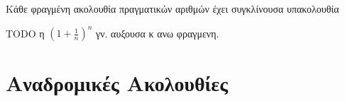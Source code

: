 \documentclass[main.tex]{subfiles}
\begin{document}
\begin{thm}
    Κάθε φραγμένη ακολουθία πραγματικών αριθμών έχει συγκλίνουσα 
    υπακολουθία
\end{thm}


TODO η $ (1+ \frac{1}{n} )^{n} $ γν. αυξουσα κ ανω φραγμενη.

\section{Αναδρομικές Ακολουθίες}
\end{document}
